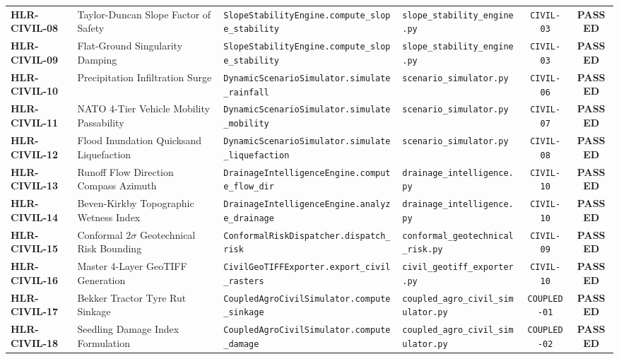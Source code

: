 \documentclass[11pt,a4paper]{article}
\theoremstyle{definition}
\theoremstyle{remark}
\begin{document}
\begin{table}[htbp]
\begin{tabular}{lp{4.2cm}lp{2.8cm}cc}
\textbf{HLR-CIVIL-08} & Taylor-Duncan Slope Factor of Safety & \texttt{SlopeStabilityEngine.compute\_slope\_stability} & \texttt{slope\_stability\_engine.py} & \texttt{CIVIL-03} & \textbf{PASSED} \\
\textbf{HLR-CIVIL-09} & Flat-Ground Singularity Damping & \texttt{SlopeStabilityEngine.compute\_slope\_stability} & \texttt{slope\_stability\_engine.py} & \texttt{CIVIL-03} & \textbf{PASSED} \\
\textbf{HLR-CIVIL-10} & Precipitation Infiltration Surge & \texttt{DynamicScenarioSimulator.simulate\_rainfall} & \texttt{scenario\_simulator.py} & \texttt{CIVIL-06} & \textbf{PASSED} \\
\textbf{HLR-CIVIL-11} & NATO 4-Tier Vehicle Mobility Passability & \texttt{DynamicScenarioSimulator.simulate\_mobility} & \texttt{scenario\_simulator.py} & \texttt{CIVIL-07} & \textbf{PASSED} \\
\textbf{HLR-CIVIL-12} & Flood Inundation Quicksand Liquefaction & \texttt{DynamicScenarioSimulator.simulate\_liquefaction} & \texttt{scenario\_simulator.py} & \texttt{CIVIL-08} & \textbf{PASSED} \\
\textbf{HLR-CIVIL-13} & Runoff Flow Direction Compass Azimuth & \texttt{DrainageIntelligenceEngine.compute\_flow\_dir} & \texttt{drainage\_intelligence.py} & \texttt{CIVIL-10} & \textbf{PASSED} \\
\textbf{HLR-CIVIL-14} & Beven-Kirkby Topographic Wetness Index & \texttt{DrainageIntelligenceEngine.analyze\_drainage} & \texttt{drainage\_intelligence.py} & \texttt{CIVIL-10} & \textbf{PASSED} \\
\textbf{HLR-CIVIL-15} & Conformal $2\sigma$ Geotechnical Risk Bounding & \texttt{ConformalRiskDispatcher.dispatch\_risk} & \texttt{conformal\_geotechnical\_risk.py} & \texttt{CIVIL-09} & \textbf{PASSED} \\
\textbf{HLR-CIVIL-16} & Master 4-Layer GeoTIFF Generation & \texttt{CivilGeoTIFFExporter.export\_civil\_rasters} & \texttt{civil\_geotiff\_exporter.py} & \texttt{CIVIL-10} & \textbf{PASSED} \\
\textbf{HLR-CIVIL-17} & Bekker Tractor Tyre Rut Sinkage & \texttt{CoupledAgroCivilSimulator.compute\_sinkage} & \texttt{coupled\_agro\_civil\_simulator.py} & \texttt{COUPLED-01} & \textbf{PASSED} \\
\textbf{HLR-CIVIL-18} & Seedling Damage Index Formulation & \texttt{CoupledAgroCivilSimulator.compute\_damage} & \texttt{coupled\_agro\_civil\_simulator.py} & \texttt{COUPLED-02} & \textbf{PASSED} \\

\end{tabular}
\end{table}
\end{document}
